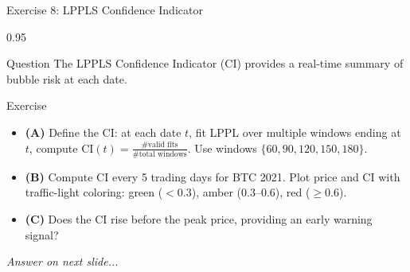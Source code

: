 \documentclass[9pt, aspectratio=169, t]{beamer}
\begin{document}
\begin{frame}{Exercise 8: LPPLS Confidence Indicator}
    \begin{cminipage}{0.95\textwidth}
    \begin{alertblock}{Question}
        The LPPLS Confidence Indicator (CI) provides a real-time summary of bubble risk at each date.
    \end{alertblock}

    \vspace{0.15cm}

    \begin{block}{Exercise}
        \begin{itemize}\setlength{\itemsep}{3pt}
            \item \textcolor{MainBlue}{\textbf{(A)}} Define the CI: at each date $t$, fit LPPL over multiple windows ending at $t$, compute CI$(t) = \frac{\text{\# valid fits}}{\text{\# total windows}}$. Use windows $\{60, 90, 120, 150, 180\}$.
            \item \textcolor{MainBlue}{\textbf{(B)}} Compute CI every 5 trading days for BTC 2021. Plot price and CI with traffic-light coloring: green ($< 0.3$), amber ($0.3$--$0.6$), red ($\geq 0.6$).
            \item \textcolor{MainBlue}{\textbf{(C)}} Does the CI rise before the peak price, providing an early warning signal?
        \end{itemize}
    \end{block}

    \vspace{0.15cm}

    \begin{center}
        \textit{Answer on next slide...}
    \end{center}
    \end{cminipage}
\end{frame}
\end{document}
